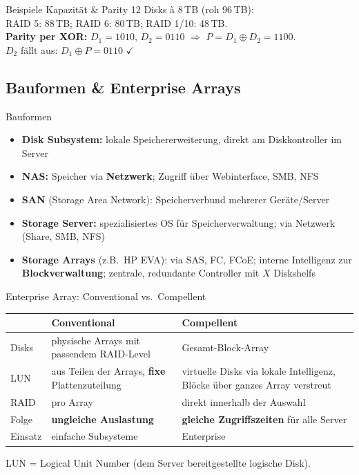 \documentclass[a4paper, fontsize=7pt]{scrartcl}
\renewcommand*{\arraystretch}{1.5}  %
\begin{document}
\begin{subbox}{Beispiele Kapazität \& Parity}
12 Disks à 8\,TB (roh 96\,TB):\\
RAID 5: 88\,TB; RAID 6: 80\,TB; RAID 1/10: 48\,TB.\\[2pt]
\textbf{Parity per XOR:} $D_1 = 1010$, $D_2 = 0110$
$\Rightarrow$ $P = D_1 \oplus D_2 = 1100$.\\
$D_2$ fällt aus: $D_1 \oplus P = 0110$ $\checkmark$
\end{subbox}

\subsection{Bauformen \& Enterprise Arrays}

\begin{mainbox}{Bauformen}
\begin{itemize}
    \item \textbf{Disk Subsystem:} lokale Speichererweiterung, direkt am
          Diskkontroller im Server
    \item \textbf{NAS:} Speicher via \textbf{Netzwerk}; Zugriff über
          Webinterface, SMB, NFS
    \item \textbf{SAN} (Storage Area Network): Speicherverbund mehrerer
          Geräte/Server
    \item \textbf{Storage Server:} spezialisiertes OS für Speicherverwaltung;
          via Netzwerk (Share, SMB, NFS)
    \item \textbf{Storage Arrays} (z.B.\ HP EVA): via SAS, FC, FCoE; interne
          Intelligenz zur \textbf{Blockverwaltung}; zentrale, redundante
          Controller mit $X$ Diskshelfs
\end{itemize}
\end{mainbox}

\begin{mainbox}{Enterprise Array: Conventional vs.\ Compellent}
\renewcommand*{\arraystretch}{1.2}
\begin{tabularx}{\linewidth}{@{}l|>{\raggedright\arraybackslash}X|>{\raggedright\arraybackslash}X@{}}
 & \textbf{Conventional} & \textbf{Compellent} \\
\hline
Disks & physische Arrays mit passendem RAID-Level & Gesamt-Block-Array \\
LUN & aus Teilen der Arrays, \textbf{fixe} Plattenzuteilung & virtuelle Disks via
  lokale Intelligenz, Blöcke über ganzes Array verstreut \\
RAID & pro Array & direkt innerhalb der Auswahl \\
Folge & \textbf{ungleiche Auslastung} & \textbf{gleiche Zugriffszeiten} für alle
  Server \\
Einsatz & einfache Subsysteme & Enterprise \\
\end{tabularx}
LUN = Logical Unit Number (dem Server bereitgestellte logische Disk).
\end{mainbox}
\end{document}
